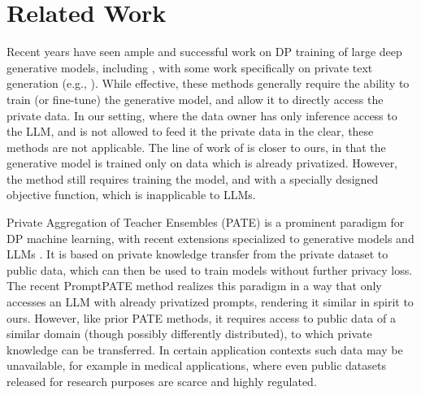 \section{Related Work}
\label{sec:related}


Recent years have seen ample and successful work on DP training of large deep generative models, including \cite{xie2018differentially,torkzadehmahani2019dp,chen2020gs,ramaswamy2020training,cao2021don,yu2021differentially,li2021large,zhang2023dpzero,tang2024private}, with some work specifically on private text generation (e.g., \cite{torfi2022differentially,yue2022synthetic,tang2023privacy}).
While effective, these methods generally require the ability to train (or fine-tune) the generative model, and allow it to directly access the private data. In our setting, where the data owner has only inference access to the LLM, and is not allowed to feed it the private data in the clear, these methods are not applicable. The line of work of \cite{harder2021dp,vinaroz2022hermite} is closer to ours, in that the generative model is trained only on data which is already privatized. However, the method still requires training the model, and with a specially designed objective function, which is inapplicable to LLMs. 

Private Aggregation of Teacher Ensembles (PATE) \cite{papernot2016semi,papernot2018scalable} is a prominent paradigm for DP machine learning, with recent extensions specialized to generative models \cite{jordon2018pate} and LLMs 
\cite{duan2023flocks}. It is based on private knowledge transfer from the private dataset to public data, which can then be used to train models without further privacy loss. The recent PromptPATE method \cite{duan2023flocks} realizes this paradigm in a way that only accesses an LLM with already privatized prompts, rendering it similar in spirit to ours. However, like prior PATE methods, it requires access to public data of a similar domain (though possibly differently distributed), to which private knowledge can be transferred.
In certain application contexts such data may be unavailable, for example in medical applications, where even public datasets released for research purposes are scarce and highly regulated. 


